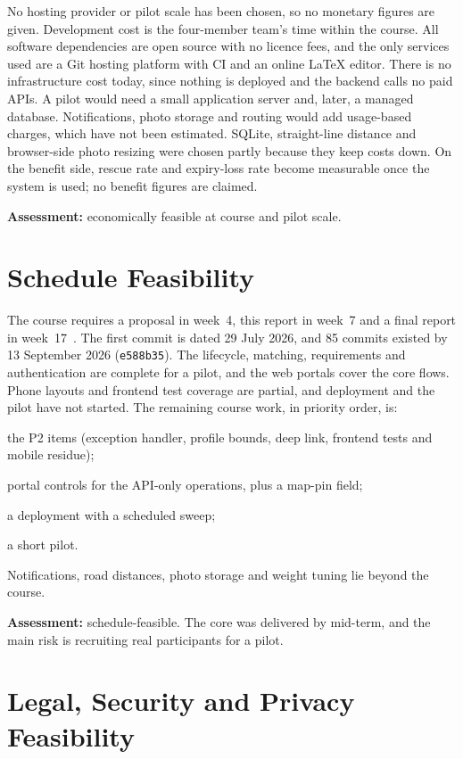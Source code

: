 No hosting provider or pilot scale has been chosen, so no monetary figures are
given. Development cost is the four-member team's time within the course. All
software dependencies are open source with no licence fees, and the only
services used are a Git hosting platform with CI and an online LaTeX editor.
There is no infrastructure cost today, since nothing is deployed and the backend
calls no paid APIs. A pilot would need a small application server and, later, a
managed database. Notifications, photo storage and routing would add usage-based
charges, which have not been estimated. SQLite, straight-line distance and
browser-side photo resizing were chosen partly because they keep costs down. On
the benefit side, rescue rate and expiry-loss rate become measurable once the
system is used; no benefit figures are claimed.

\textbf{Assessment:} economically feasible at course and pilot scale.

\section{Schedule Feasibility}
\label{sec:feas-schedule}

The course requires a proposal in week~4, this report in week~7 and a final
report in week~17~\cite{ucs503Project}. The first commit is dated 29 July 2026,
and 85 commits existed by 13 September 2026 (\texttt{e588b35}). The lifecycle,
matching, requirements and authentication are complete for a pilot, and the web
portals cover the core flows. Phone layouts and frontend test coverage are
partial, and deployment and the pilot have not started. The remaining course
work, in priority order, is:
\begin{enumerate*}[label=(\arabic*)]
  \item the P2 items (exception handler, profile bounds, deep link, frontend
    tests and mobile residue);
  \item portal controls for the API-only operations, plus a map-pin field;
  \item a deployment with a scheduled sweep;
  \item a short pilot.
\end{enumerate*}
Notifications, road distances, photo storage and weight tuning lie beyond the
course.

\textbf{Assessment:} schedule-feasible. The core was delivered by mid-term, and
the main risk is recruiting real participants for a pilot.

\section{Legal, Security and Privacy Feasibility}
\label{sec:feas-legal}

